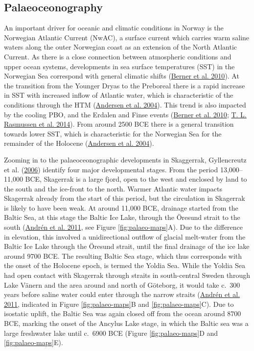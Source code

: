 \documentclass[
  12pt,
  a4paper,
  oneside]{book}
\begin{document}
\hypertarget{palaeoceonography}{%
\subsection{Palaeoceonography}\label{palaeoceonography}}

An important driver for oceanic and climatic conditions in Norway is the Norwegian Atlantic Current (NwAC), a surface current which carries warm saline waters along the outer Norwegian coast as an extension of the North Atlantic Current. As there is a close connection between atmospheric conditions and upper ocean systems, developments in sea surface temperatures (SST) in the Norwegian Sea correspond with general climatic shifts (\protect\hyperlink{ref-berner2010}{Berner et al. 2010}). At the transition from the Younger Dryas to the Preboreal there is a rapid increase in SST with increased inflow of Atlantic water, which is characteristic of the conditions through the HTM (\protect\hyperlink{ref-andersen2004}{Andersen et al. 2004}). This trend is also impacted by the cooling PBO, and the Erdalen and Finse events (\protect\hyperlink{ref-berner2010}{Berner et al. 2010}; \protect\hyperlink{ref-rasmussen2014b}{T. L. Rasmussen et al. 2014}). From around 2500 BCE there is a general transition towards lower SST, which is characteristic for the Norwegian Sea for the remainder of the Holocene (\protect\hyperlink{ref-andersen2004}{Andersen et al. 2004}).

Zooming in to the palaeoceonographic developments in Skaggerrak, Gyllencreutz et al. (\protect\hyperlink{ref-gyllencreutz2006}{2006}) identify four major developmental stages. From the period 13,000--11,000 BCE, Skagerrak is a large fjord, open to the west and enclosed by land to the south and the ice-front to the north. Warmer Atlantic water impacts Skagerrak already from the start of this period, but the circulation in Skagerrak is likely to have been weak. At around 11,000 BCE, drainage started from the Baltic Sea, at this stage the Baltic Ice Lake, through the Öresund strait to the south (\protect\hyperlink{ref-andren2011}{Andrén et al. 2011}, see Figure \ref{fig:palaeo-maps}A). Due to the difference in elevation, this involved a unidirectional outflow of glacial melt-water from the Baltic Ice Lake through the Öresund strait, until the final drainage of the ice lake around 9700 BCE. The resulting Baltic Sea stage, which thus corresponds with the onset of the Holocene epoch, is termed the Yoldia Sea. While the Yoldia Sea had open contact with Skagerrak through straits in south-central Sweden through Lake Vänern and the area around and north of Göteborg, it would take c.~300 years before saline water could enter through the narrow straits (\protect\hyperlink{ref-andren2011}{Andrén et al. 2011}, indicated in Figure \ref{fig:palaeo-maps}B and \ref{fig:palaeo-maps}C). Due to isostatic uplift, the Baltic Sea was again closed off from the ocean around 8700 BCE, marking the onset of the Ancylus Lake stage, in which the Baltic sea was a large freshwater lake until c.~6900 BCE (Figure \ref{fig:palaeo-maps}D and \ref{fig:palaeo-maps}E).
\end{document}
